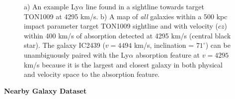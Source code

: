 \documentclass[12pt]{article}
\begin{document}
\begin{figure}[ht!]
\centering
  \caption{\small{a) An example Ly$\alpha$ line found in a sightline towards target TON1009 at 4295 km/s. b) A map of \textit{all} galaxies within a 500 kpc impact parameter target TON1009 sightline and with velocity ($cz$) within 400 km/s of absorption detected at 4295 km/s (central black star). The galaxy IC2439 ($v=4494$ km/s, inclination = $71^{\circ}$) can be unambiguously paired with the Ly$\alpha$ absorption feature at $v=4295$ km/s because it is the largest and closest galaxy in both physical and velocity space to the absorption feature.}}
\vspace{5pt}
\end{figure}



\noindent \textbf{Nearby Galaxy Dataset}
\end{document}
